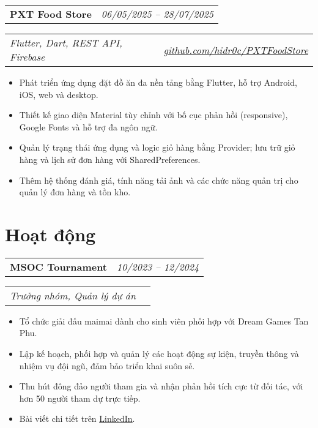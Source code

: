 \documentclass[a4paper,11pt]{article}
\begin{document}
\begin{spacing}{1.05}
\begin{minipage}[t]{\linewidth}
  \begin{tabularx}{\linewidth}{@{}l r@{}}
    \textbf{PXT Food Store} & \hspace*{0.63\linewidth}\normalsize\textit{06/05/2025 -- 28/07/2025} \\
  \end{tabularx}
  \begin{tabularx}{\linewidth}{@{}l r@{}}
  \normalsize\textit{Flutter, Dart, REST API, Firebase} & \hspace*{0.405\linewidth}\href{https://github.com/hidr0c/PXTFoodStore}{\normalsize\textit{github.com/hidr0c/PXTFoodStore}}\\
  \end{tabularx}
 \begin{itemize} [nosep,leftmargin=1.2em,itemsep=2pt]
  \item Phát triển ứng dụng đặt đồ ăn đa nền tảng bằng Flutter, hỗ trợ Android, iOS, web và desktop.
  \item Thiết kế giao diện Material tùy chỉnh với bố cục phản hồi (responsive), Google Fonts và hỗ trợ đa ngôn ngữ.
  \item Quản lý trạng thái ứng dụng và logic giỏ hàng bằng Provider; lưu trữ giỏ hàng và lịch sử đơn hàng với SharedPreferences.
  \item Thêm hệ thống đánh giá, tính năng tải ảnh và các chức năng quản trị cho quản lý đơn hàng và tồn kho.
\end{itemize}
\end{minipage}
\end{spacing}

\section{Hoạt động}
\begin{spacing}{1.05}
\begin{tabularx}{\linewidth}{@{}l r@{}}
  \textbf{MSOC Tournament} & \hspace*{0.64\linewidth}\normalsize\textit{ 10/2023 --  12/2024} \\
\end{tabularx}
\begin{tabularx}{\linewidth}{@{}l r@{}}
  \normalsize\textit{Trưởng nhóm, Quản lý dự án} 
  \end{tabularx}
\begin{itemize}[nosep,leftmargin=1.2em,itemsep=2pt]
  \item Tổ chức giải đấu maimai dành cho sinh viên phối hợp với Dream Games Tan Phu.
  \item Lập kế hoạch, phối hợp và quản lý các hoạt động sự kiện, truyền thông và nhiệm vụ đội ngũ, đảm bảo triển khai suôn sẻ.
  \item Thu hút đông đảo người tham gia và nhận phản hồi tích cực từ đối tác, với hơn 50 người tham dự trực tiếp.
  \item Bài viết chi tiết trên \href{https://www.linkedin.com/feed/update/urn:li:activity:7300042302784233472/}{\underline{LinkedIn}}.
\end{itemize}
\end{spacing}

\vspace*{\fill}
\end{document}
